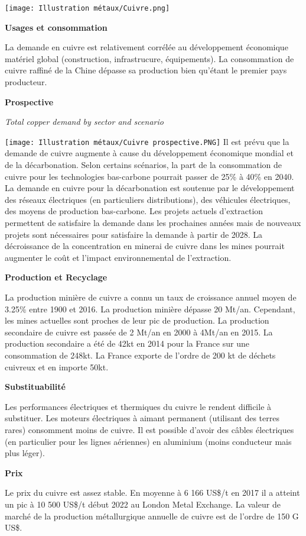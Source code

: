 
\begin{center}
    \texttt{[image: Illustration métaux/Cuivre.png]}
\end{center}
\begin{center}
    \textbf{Usages et consommation}
\end{center}
La demande en cuivre est relativement corrélée au développement économique matériel global (construction, infrastrucure, équipements).
La consommation de cuivre raffiné de la Chine dépasse sa production bien qu'étant le premier pays producteur.
\begin{center}
    \textbf{Prospective}
\end{center}
\begin{multicols}{2}
    \begin{center}
        \textit{Total copper demand by sector and scenario}
    \end{center}
    \texttt{[image: Illustration métaux/Cuivre prospective.PNG]}
    \vfill\null
    \columnbreak
    Il est prévu que la demande de cuivre augmente à cause du développement 
    économique mondial et de la décarbonation. Selon certains scénarios, la part de la consommation de
     cuivre pour les technologies bas-carbone
    pourrait passer de 25\% à 40\% en 2040. La demande en cuivre pour la décarbonation est
    soutenue par le développement des réseaux électriques (en particuliers distributions), 
    des véhicules électriques, des moyens de production bas-carbone.
    Les projets actuels d'extraction permettent de satisfaire la demande dans les prochaines années mais de nouveaux projets
    sont nécessaires pour satisfaire la demande à partir de 2028. La décroissance de la concentration en minerai de cuivre dans les mines
    pourrait augmenter le coût et l'impact environnemental de l'extraction.
\end{multicols}
\begin{center}
    \textbf{Production et Recyclage}
\end{center}
La production minière de cuivre a connu un taux de croissance annuel moyen de 3.25\% entre 1900 et 2016. La production minière dépasse 20 Mt/an. Cependant, les mines actuelles
sont proches de leur pic de production. La production secondaire de cuivre est passée de 2 Mt/an en 2000 à 4Mt/an en 2015.
La production secondaire a été de 42kt en 2014 pour la France sur une consommation de 248kt. La France exporte de l'ordre de 200 kt de
déchets cuivreux et en importe 50kt.
\begin{center}
    \textbf{Substituabilité}
\end{center}
Les performances électriques et thermiques du cuivre le rendent difficile à substituer. Les moteurs électriques à aimant permanent
(utilisant des terres rares) consomment moins de cuivre. Il est possible d'avoir des câbles électriques (en particulier pour les lignes aériennes)
en aluminium (moins conducteur mais plus léger).
\begin{center}
    \textbf{Prix}
\end{center}
Le prix du cuivre est assez stable. En moyenne à 6 166 US\$/t en 2017 il a atteint un pic à 10 500 US\$/t début 2022
au London Metal Exchange. La valeur de marché de la production métallurgique annuelle de cuivre est de l'ordre de 150 G US\$.

